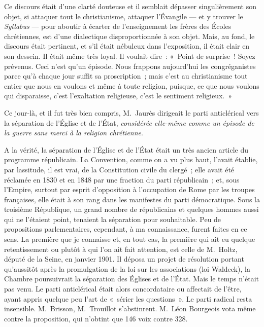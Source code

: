 \documentclass[french,twoside]{book} %
\begin{document}
Ce discours était d’une clarté douteuse et il semblait dépasser singulièrement son objet, si attaquer tout le christianisme, attaquer l’Évangile — et y trouver le \emph{Syllabus} — pour aboutir à écarter de l’enseignement les frères des Écoles chrétiennes, est d’une dialectique disproportionnée à son objet. Mais, au fond, le discours était pertinent, et s’il était nébuleux dans l’exposition, il était clair en son dessein. Il était même très loyal. Il voulait dire : « Point de surprise ! Soyez prévenus. Ceci  n’est qu’un épisode. Nous frappons aujourd’hui les congréganistes parce qu’à chaque jour suffit sa proscription ; mais c’est au christianisme tout entier que nous en voulons et même à toute religion, puisque, ce que nous voulons qui disparaisse, c’est l’exaltation religieuse, c’est le sentiment religieux. »\par
Ce jour-là, et il fut très bien compris, M. Jaurès dirigeait le parti anticlérical vers la séparation de l’Église et de l’État, {\itshape considérée elle-même comme un épisode de la guerre sans merci à la religion chrétienne}.\par
A la vérité, la séparation de l’Église et de l’État était un très ancien article du programme républicain. La Convention, comme on a vu plus haut, l’avait établie, par lassitude, il est vrai, de la Constitution civile du clergé ; elle avait été réclamée en 1830 et en 1848 par une fraction du parti républicain ; et, sous l’Empire, surtout par esprit d’opposition à l’occupation de Rome par les troupes françaises, elle était à son rang dans les manifestes du parti démocratique. Sous la troisième République, un grand nombre de républicains et quelques hommes aussi qui ne l’étaient point, tenaient la séparation pour souhaitable. Peu de propositions parlementaires, cependant, à ma connaissance, furent faites en ce sens. La première que je connaisse  et, en tout cas, la première qui ait eu quelque retentissement ou plutôt à qui l’on ait fait attention, est celle de M. Holtz, député de la Seine, en janvier 1901. Il déposa un projet de résolution portant qu’aussitôt après la promulgation de la loi sur les associations (loi Waldeck), la Chambre poursuivrait la séparation des Églises et de l’État. Mais le temps n’était pas venu. Le parti anticlérical était alors concordataire ou affectait de l’être, ayant appris quelque peu l’art de « sérier les questions ». Le parti radical resta insensible. M. Brisson, M. Trouillot s’abstinrent. M. Léon Bourgeois vota même contre la proposition, qui n’obtint que 146 voix contre 328.\par
\end{document}
